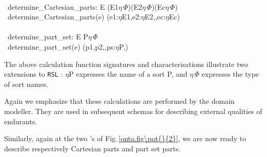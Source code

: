 %
\bp
{}\\
\>\ determine\_Cartesian\_parts: E {\RIGHTARROW} (E1{\TIMES}$\eta$\,$\Phi$){\TIMES}(E2{\TIMES}$\eta$\,$\Phi$){\TIMES}{\DOTDOTDOT}{\TIMES}(Ec{\TIMES}$\eta$\,$\Phi$)\\
\>\ determine\_Cartesian\_parts(e)  (e1:$\eta$E1,e2:$\eta$E2,{\DOTDOTDOT},ec:$\eta$Ec)\\
\\
\>\ determine\_part\_set: E {\RIGHTARROW} P$\eta$\,$\Phi$\\
\>\ determine\_part\_set(e)  ({\LBRACE}p1,p2,{\DOTDOTDOT},ps{\RBRACE}:$\eta$P,)
\ep
\eff
{}

\noindent
\begynd
\pind The above \textsf{calc}ulation function signatures and
      characterisations illustrate two extensions to \texttt{RSL}
      \cite{RSL}:
\begynd
\pind \textsf{$\eta$P} expresses the name of a sort \textsf{P}, and
\pind \textsf{$\eta$\,$\Phi$} expresses the  type of sort names.
\afslut

\pind Again we emphasize that these \textsf{calc}ulations 
\pind are performed by the domain modeller.
\pind They are used in subsequent schemas for describing external
      qualities of endurants.
\afslut


\begynd
\pind Similarly,
\begynd
\pind again at the two \dbsquare's of Fig.\,\vref{onto.fig\pot{}{2}},
\pind we are now ready to describe respectively
\begynd
\pind Cartesian parts and
\pind part set parts.
\afslut
\afslut
\afslut

\label{Describing Cartesian Parts}

